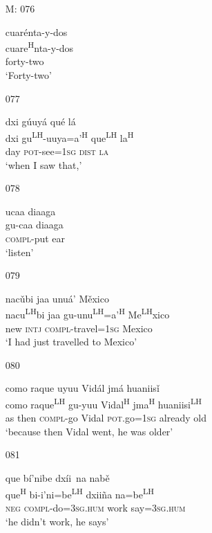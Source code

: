 \begin{itemize}
\item[M: 076]
 
\glll   cuar\'{e}nta-y-dos\\
cuare\textsuperscript{H}nta-y-dos\\
forty-two\\
\glt `Forty-two' 
 

\item[077]
 
\glll  dxi g\'{u}uy\'{a} qu\'{e} l\'{a}\\
dxi gu\textsuperscript{LH}-uuya=a'\textsuperscript{H} que\textsuperscript{LH} la\textsuperscript{H}\\
day \textsc{pot}-see=\textsc{1sg} \textsc{dist} \textsc{la}\\
\glt `when  I saw that,'
 

\item[078]
 
\glll  ucaa diaaga\\
gu-caa diaaga\\
\textsc{compl}-put ear\\
\glt `listen'
 


\item[079]
 
\glll   nac\v{u}bi jaa unu\'{a}' M\v{e}xico\\ 
nacu\textsuperscript{LH}bi jaa gu-unu\textsuperscript{LH}=a'\textsuperscript{H} Me\textsuperscript{LH}xico\\
new \textsc{intj} \textsc{compl}-travel=\textsc{1sg} Mexico\\
\glt `I had just travelled to Mexico'
 


\item[080]
 
\glll   como raque uyuu Vid\'{a}l jm\'{a} huaniis\v{i}\\
como raque\textsuperscript{LH} gu-yuu Vidal\textsuperscript{H}  jma\textsuperscript{H} huaniisi\textsuperscript{LH}\\
as then \textsc{compl}-go Vidal \textsc{pot}.go=\textsc{1sg} already old\\
\glt `because then Vidal went, he was older' 
 


\item[081]
 
\glll   que b\'{i}'nibe dx\'{i}i~{n}a nab\v{e} \\
que\textsuperscript{H} bi-i'ni=be\textsuperscript{LH} dxii\~{n}a na=be\textsuperscript{LH}\\
\textsc{neg} \textsc{compl}-do=\textsc{3sg.hum} work say=\textsc{3sg.hum}\\
\glt `he didn't work, he says'
 



\end{itemize}
